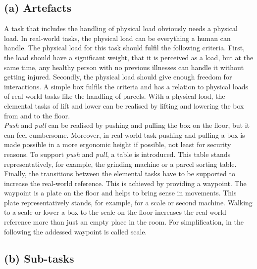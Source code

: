 \subsection{(a) Artefacts}
A task that includes the handling of physical load obviously needs a physical load. In real-world tasks, the physical load can be everything a human can handle. The physical load for this task should fulfil the following criteria. First, the load should have a significant weight, that it is perceived as a load, but at the same time, any healthy person with no previous illnesses can handle it without getting injured. Secondly, the physical load should give enough freedom for interactions. A simple box fulfils the criteria and has a relation to physical loads of real-world tasks like the handling of parcels. With a physical load, the elemental tasks of lift and lower can be realised by lifting and lowering the box from and to the floor.\\
\textit{Push} and \textit{pull} can be realised by pushing and pulling the box on the floor, but it can feel cumbersome. Moreover, in real-world task pushing and pulling a box is made possible in a more ergonomic height if possible, not least for security reasons. To support \textit{push} and \textit{pull}, a table is introduced. This table stands representatively, for example, the grinding machine or a parcel sorting table.\\
Finally, the transitions between the elemental tasks have to be supported to increase the real-world reference. This is achieved by providing a waypoint. The waypoint is a plate on the floor and helps to bring sense in movements. This plate representatively stands, for example, for a scale or second machine. Walking to a scale or lower a box to the scale on the floor increases the real-world reference more than just an empty place in the room. For simplification, in the following the addessed waypoint is called scale.

\subsection{(b) Sub-tasks}
\label{sec:subTasks}

